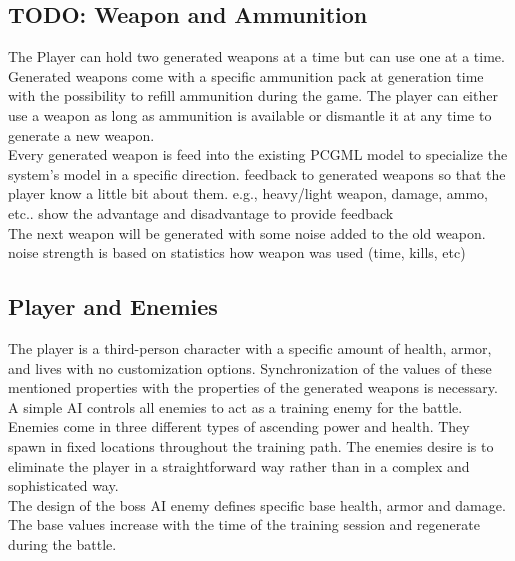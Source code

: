 \documentclass[MGS,Master,english]{twbook}%
\begin{document}
\subsection{TODO: Weapon and Ammunition}
The Player can hold two generated weapons at a time but can use one at a time. Generated weapons come with a specific ammunition pack at generation time with the possibility to refill ammunition during the game. The player can either use a weapon as long as ammunition is available or dismantle it at any time to generate a new weapon.\\
Every generated weapon is feed into the existing PCGML model to specialize the system’s model in a specific direction.
{\color{blue} feedback to generated weapons so that the player know a little bit about them. e.g., heavy/light weapon, damage, ammo, etc.. show the advantage and disadvantage to provide feedback\\
The next weapon will be generated with some noise added to the old weapon. noise strength is based on statistics how weapon was used (time, kills, etc)}

\subsection{Player and Enemies}
The player is a third-person character with a specific amount of health, armor, and lives with no customization options. Synchronization of the values of these mentioned properties with the properties of the generated weapons is necessary.\\
A simple AI controls all enemies to act as a training enemy for the battle. Enemies come in three different types of ascending power and health. They spawn in fixed locations throughout the training path. The enemies desire is to eliminate the player in a straightforward way rather than in a complex and sophisticated way. \\
The design of the boss AI enemy defines specific base health, armor and damage. The base values increase with the time of the training session and regenerate during the battle.

\end{document}
